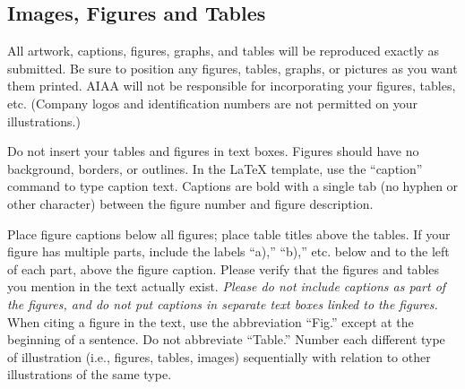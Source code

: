 \documentclass[conf]{new-aiaa}
\begin{document}
\subsection{Images, Figures and Tables}
All artwork, captions, figures, graphs, and tables will be reproduced exactly as submitted. Be sure to position any figures, tables, graphs, or pictures as you want them printed. AIAA will not be responsible for incorporating your figures, tables, etc. (Company logos and identification numbers are not permitted on your illustrations.)

Do not insert your tables and figures in text boxes. Figures should have no background, borders, or outlines. In the \LaTeX{} template, use the ``caption'' command to type caption text. Captions are bold with a single tab (no hyphen or other character) between the figure number and figure description.




Place figure captions below all figures; place table titles above the tables. If your figure has multiple parts, include the labels ``a),'' ``b),'' etc. below and to the left of each part, above the figure caption. Please verify that the figures and tables you mention in the text actually exist. \emph{Please do not include captions as part of the figures, and do not put captions in separate text boxes linked to the figures.} When citing a figure in the text, use the abbreviation ``Fig.'' except at the beginning of a sentence. Do not abbreviate ``Table.'' Number each different type of illustration (i.e., figures, tables, images) sequentially with relation to other illustrations of the same type.
\end{document}
